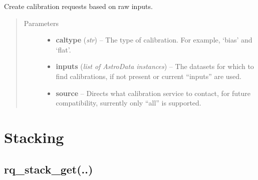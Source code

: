 \documentclass[letterpaper,10pt,english]{sphinxmanual}
\begin{document}
\begin{fulllineitems}
\label{chapter_ReductionContextClass:astrodata.RecipeManager.ReductionContext.rq_cal}
Create calibration requests based on raw inputs.
\begin{quote}\begin{description}
\item[{Parameters}] \leavevmode\begin{itemize}
\item {} 
\textbf{caltype} (\emph{str}) -- The type of calibration. For example, `bias' and `flat'.

\item {} 
\textbf{inputs} (\emph{list of AstroData instances}) -- The datasets for which to find calibrations, if not present
or  current ``inputs'' are used.

\item {} 
\textbf{source} -- Directs what calibration service to contact, for future
compatibility, surrently only ``all'' is supported.

\end{itemize}

\end{description}\end{quote}

\end{fulllineitems}



\section{Stacking}
\label{chapter_ReductionContextClass:stacking}

\subsection{rq\_stack\_get(..)}
\label{chapter_ReductionContextClass:rq-stack-get}
\end{document}
